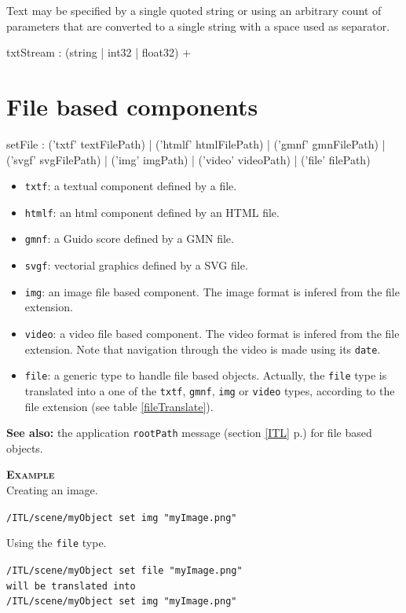 \documentclass[a4paper,twoside]{report}
\newcommand{\sublevel}[1]	{\section{#1}}
\newcommand{\fullref}[1]	{\ref{#1} p.\pageref{#1}}
\newcommand{\OSC}[1]		{\texttt{#1}}
\newcommand{\example}		{\textbf{\hspace{-1.5cm}\textbf{\textsc{Example }}}}
\renewcommand{\seealso}	{\textbf{See also: }}
\newcommand{\sample}	[1]			{\vspace{-2mm}\begin{center}\colorbox{mygrey}{
								\begin{minipage}[t]{0.9\columnwidth} 
								{\small \texttt{#1}}
								\end{minipage}}\end{center}}
\begin{document}
Text may be specified by a single quoted string or using an arbitrary count of parameters that are converted to a single string with a space used as separator.
\begin{rail}
txtStream :  (string | int32 | float32) +
\end{rail}


\sublevel{File based components}
\label{fileset}


\label{setfile}
\begin{rail}
setFile : 
	('txtf' textFilePath) |
	('htmlf' htmlFilePath) |
	('gmnf' gmnFilePath) |
	('svgf' svgFilePath) |
	('img' imgPath) |
	('video' videoPath) |
	('file' filePath)
\end{rail}

\begin{itemize}
\item \OSC{txtf}: a textual component defined by a file.
\item \OSC{htmlf}: an html component defined by an HTML file.
\item \OSC{gmnf}: a Guido score defined by a GMN file.
\item \OSC{svgf}: vectorial graphics defined by a SVG file.
\item \OSC{img}: an image file based component. The image format is infered from the file extension.
\item \OSC{video}: a video file based component. The video format is infered from the file extension. Note that navigation through the video is made using its \OSC{date}.
\item \OSC{file}: a generic type to handle file based objects. Actually, the \OSC{file} type is translated into a one of the \OSC{txtf}, \OSC{gmnf}, \OSC{img} or \OSC{video} types, according to the file extension (see table \ref{fileTranslate}).
\end{itemize}

\seealso the application \OSC{rootPath} message (section \fullref{ITL}) for file based objects.

\example \\
Creating an image.
\sample{/ITL/scene/myObject set img "myImage.png"}
Using the \OSC{file} type.
\sample{/ITL/scene/myObject set file "myImage.png" \\
will be translated into \\
/ITL/scene/myObject set img "myImage.png"
}
\end{document}
